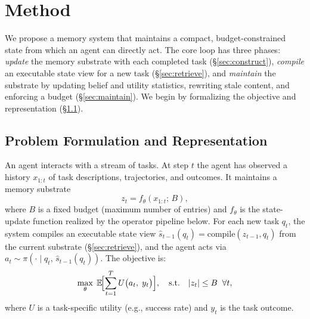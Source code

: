 \section{Method}
\label{sec:method}

We propose a memory system that maintains a compact, budget-constrained state from which an agent can directly act. The core loop has three phases: \emph{update} the memory substrate with each completed task (\S\ref{sec:construct}), \emph{compile} an executable state view for a new task (\S\ref{sec:retrieve}), and \emph{maintain} the substrate by updating belief and utility statistics, rewriting stale content, and enforcing a budget (\S\ref{sec:maintain}). We begin by formalizing the objective and representation (\S\ref{sec:formulation}).

\subsection{Problem Formulation and Representation}
\label{sec:formulation}

An agent interacts with a stream of tasks. At step $t$ the agent has observed a history $x_{1:t}$ of task descriptions, trajectories, and outcomes. It maintains a memory substrate
\begin{equation}
\label{eq:state}
  z_t = f_\theta(x_{1:t};\, B),
\end{equation}
where $B$ is a fixed budget (maximum number of entries) and $f_\theta$ is the state-update function realized by the operator pipeline below. For each new task $q_t$, the system compiles an executable state view $\hat{s}_{t-1}(q_t) = \mathrm{compile}(z_{t-1}, q_t)$ from the current substrate (\S\ref{sec:retrieve}), and the agent acts via $a_t \sim \pi(\cdot \mid q_t,\, \hat{s}_{t-1}(q_t))$. The objective is:
\begin{equation}
\label{eq:objective}
  \max_\theta \;\mathbb{E}\!\Bigl[\sum_{t=1}^{T} U\bigl(a_t,\; y_t\bigr)\Bigr],
  \quad \text{s.t.} \quad |z_t| \leq B \;\;\forall t,
\end{equation}
where $U$ is a task-specific utility (e.g., success rate) and $y_t$ is the task outcome.

